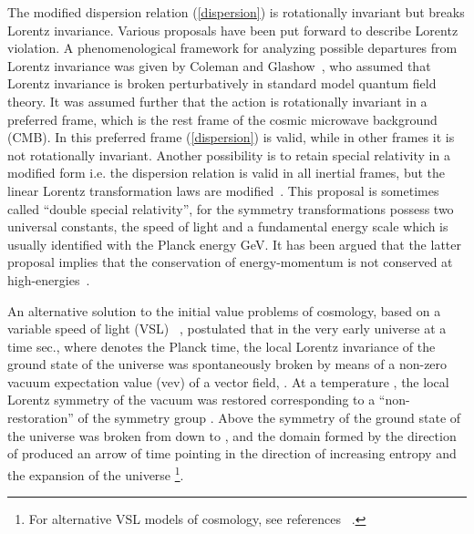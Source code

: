 \documentclass[a4paper,12pt]{article}
\begin{document}
The modified dispersion relation (\ref{dispersion}) is
rotationally invariant but breaks Lorentz invariance. Various proposals have been
put forward to describe Lorentz violation. A phenomenological framework for
analyzing possible departures from Lorentz invariance was given by Coleman and
Glashow~\cite{Glashow2}, who assumed that Lorentz invariance is broken
perturbatively in standard model quantum field theory. It was assumed further that
the action is rotationally invariant in a preferred frame, which is the rest frame
of the cosmic microwave background (CMB). In this preferred frame
(\ref{dispersion}) is valid, while in other frames it is not rotationally invariant.
Another possibility is to retain special relativity in a modified form i.e. the
dispersion relation is valid in all inertial frames, but the linear Lorentz
transformation laws are modified~\cite{Camelia2,Smolin}. This proposal is sometimes
called ``double special relativity'', for the symmetry transformations possess two
universal constants, the speed of light and a fundamental energy scale which is
usually identified with the Planck energy \coordHE{} GeV. It has been argued
that the latter proposal implies that the conservation of energy-momentum is not
conserved at high-energies~\cite{Toller}.

An alternative solution to the initial value
problems of cosmology, based on a variable speed of light (VSL)
~\cite{Moffat,Moffat2}, postulated that in the
very early universe at a time \coordHE{} sec.,
where \coordHE{} denotes the Planck time, the local Lorentz
invariance of the ground state of the universe was spontaneously
broken by means of a non-zero vacuum expectation value (vev) of a
vector field, \coordHE{}. At a temperature
\coordHE{}, the local Lorentz
symmetry of the vacuum was restored corresponding to a
``non-restoration'' of the symmetry group \coordHE{}.  Above
\coordHE{} the symmetry of the ground state of the universe was
broken from \coordHE{} down to \coordHE{}, and the domain formed by
the direction of \coordHE{} produced an arrow of
time pointing in the direction of increasing entropy and the
expansion of the universe \footnote{For alternative VSL models of cosmology, see
references ~\cite{Clayton,Clayton2,Magueijo}.}.
\end{document}
